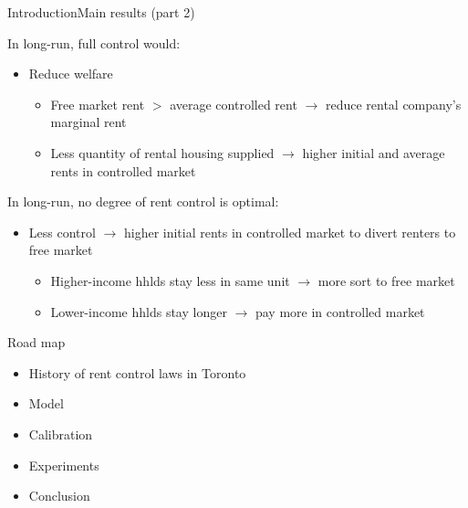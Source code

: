 \documentclass[11pt,aspectratio=169]{beamer}
\begin{document}
\begin{frame}{Introduction}{Main results (part 2)}

In long-run, full control would:

\begin{itemize}
    \item Reduce welfare
    \begin{itemize}
        \item Free market rent $>$ average controlled rent $\rightarrow$ reduce rental company's marginal rent
        \item Less quantity of rental housing supplied $\rightarrow$ higher initial and average rents in controlled market
    \end{itemize}
\end{itemize}

\vspace{0.5cm}

In long-run, no degree of rent control is optimal:

\begin{itemize}
    \item Less control $\rightarrow$ higher initial rents in controlled market to divert renters to free market
    \begin{itemize}
        \item Higher-income hhlds stay less in same unit $\rightarrow$ more sort to free market  
        \item Lower-income hhlds stay longer $\rightarrow$ pay more in controlled market
    \end{itemize}
\end{itemize}

\end{frame}
    
\begin{frame}{Road map}

\begin{itemize}
    \item History of rent control laws in Toronto
    \item Model 
    \item Calibration
    \item Experiments
    \item Conclusion
\end{itemize}

\end{frame}

\end{document}
